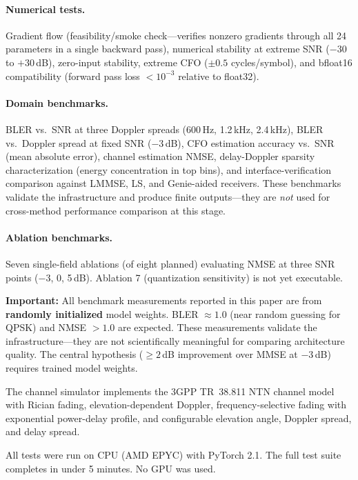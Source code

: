 \documentclass{article}
\begin{document}
\paragraph{Numerical tests.} Gradient flow (feasibility/smoke check---verifies nonzero gradients through all 24 parameters in a single backward pass), numerical stability at extreme SNR ($-30$ to $+30$\,dB), zero-input stability, extreme CFO ($\pm 0.5$ cycles/symbol), and bfloat16 compatibility (forward pass loss $< 10^{-3}$ relative to float32).

\paragraph{Domain benchmarks.} BLER vs.\ SNR at three Doppler spreads (600\,Hz, 1.2\,kHz, 2.4\,kHz), BLER vs.\ Doppler spread at fixed SNR ($-3$\,dB), CFO estimation accuracy vs.\ SNR (mean absolute error), channel estimation NMSE, delay-Doppler sparsity characterization (energy concentration in top bins), and interface-verification comparison against LMMSE, LS, and Genie-aided receivers. These benchmarks validate the infrastructure and produce finite outputs---they are \emph{not} used for cross-method performance comparison at this stage.

\paragraph{Ablation benchmarks.} Seven single-field ablations (of eight planned) evaluating NMSE at three SNR points ($-3$, 0, 5\,dB). Ablation 7 (quantization sensitivity) is not yet executable.

\noindent\textbf{Important:} All benchmark measurements reported in this paper are from \textbf{randomly initialized} model weights. BLER $\approx 1.0$ (near random guessing for QPSK) and NMSE $> 1.0$ are expected. These measurements validate the infrastructure---they are not scientifically meaningful for comparing architecture quality. The central hypothesis ($\geq 2$\,dB improvement over MMSE at $-3$\,dB) requires trained model weights.

The channel simulator implements the 3GPP TR~38.811 NTN channel model~\cite{3gppTR38811} with Rician fading, elevation-dependent Doppler, frequency-selective fading with exponential power-delay profile, and configurable elevation angle, Doppler spread, and delay spread.

All tests were run on CPU (AMD EPYC) with PyTorch 2.1. The full test suite completes in under 5 minutes. No GPU was used.
\end{document}
